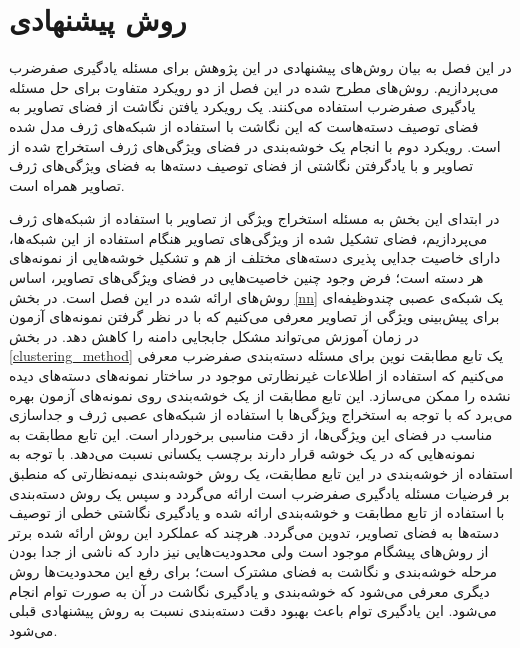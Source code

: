 \chapter{روش پیشنهادی} \label{chap:proposed}
در این فصل به بیان روش‌های پیشنهادی در این پژوهش برای مسئله یادگیری صفرضرب می‌پردازیم. روش‌های مطرح شده در این فصل از دو رویکرد متفاوت برای حل مسئله یادگیری صفرضرب استفاده می‌کنند. یک رویکرد یافتن نگاشت از فضای تصاویر به فضای توصیف دسته‌هاست که این نگاشت با استفاده از شبکه‌های ژرف مدل شده است. رویکرد دوم با انجام یک خوشه‌بندی در فضای ویژگی‌های ژرف استخراج شده از تصاویر و با یادگرفتن نگاشتی از فضای توصیف دسته‌ها به فضای ویژگی‌های ژرف تصاویر همراه است.

در ابتدای این بخش به مسئله استخراج ویژگی از تصاویر با استفاده از شبکه‌های ژرف می‌پردازیم، فضای تشکیل شده از ویژگی‌های تصاویر هنگام استفاده از این شبکه‌ها، دارای خاصیت جدایی پذیری دسته‌های مختلف از هم و تشکیل خوشه‌هایی از نمونه‌های هر دسته است؛ فرض وجود چنین خاصیت‌هایی در فضای ویژگی‌های تصاویر، اساس روش‌های ارائه شده در این فصل است.
در بخش \ref{nn} یک شبکه‌ی عصبی چندوظیفه‌ای برای پیش‌بینی ویژگی از تصاویر معرفی می‌کنیم که با در نظر گرفتن نمونه‌های آزمون در زمان آموزش می‌تواند مشکل جابجایی دامنه را کاهش دهد.
در بخش
\ref{clustering_method}
 یک تابع مطابقت نوین برای مسئله دسته‌بندی صفرضرب معرفی می‌کنیم که استفاده از اطلاعات غیرنظارتی موجود در ساختار نمونه‌های دسته‌های دیده نشده را ممکن می‌سازد. این تابع مطابقت از یک خوشه‌بندی روی نمونه‌های آزمون بهره می‌برد که با توجه به استخراج ویژگی‌ها با استفاده از شبکه‌های عصبی ژرف و جداسازی مناسب در فضای این ویژگی‌ها، از دقت مناسبی برخوردار است. این تابع مطابقت به نمونه‌هایی که در یک خوشه قرار دارند برچسب یکسانی نسبت می‌دهد. با توجه به استفاده از خوشه‌بندی در این تابع مطابقت، یک روش خوشه‌بندی نیمه‌نظارتی که منطبق بر فرضیات مسئله یادگیری صفرضرب است ارائه می‌گردد و سپس یک روش دسته‌بندی با استفاده از تابع مطابقت و خوشه‌بندی ارائه شده و یادگیری نگاشتی خطی از توصیف دسته‌ها به فضای تصاویر، تدوین می‌گردد. هرچند که عملکرد این روش ارائه شده برتر از روش‌های پیشگام موجود است ولی محدودیت‌هایی نیز دارد که ناشی از جدا بودن مرحله خوشه‌بندی و نگاشت به فضای مشترک است؛ برای رفع این محدودیت‌ها روش دیگری معرفی می‌شود که خوشه‌بندی و یادگیری نگاشت در آن به صورت توام انجام می‌شود. این یادگیری توام باعث بهبود دقت دسته‌بندی نسبت به روش پیشنهادی قبلی می‌شود.

